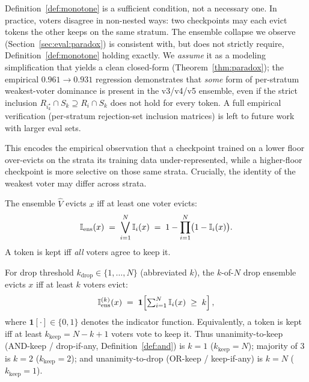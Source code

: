\begin{remark}
Definition~\ref{def:monotone} is a sufficient condition, not a necessary one.
In practice, voters disagree in non-nested ways: two checkpoints may each
evict tokens the other keeps on the same stratum. The ensemble collapse we
observe (Section~\ref{sec:eval:paradox}) is consistent with, but does not
strictly require, Definition~\ref{def:monotone} holding exactly. We
\emph{assume} it as a modeling simplification that yields a clean closed-form
(Theorem~\ref{thm:paradox}); the empirical $0.961\to0.931$ regression
demonstrates that \emph{some} form of per-stratum weakest-voter dominance
is present in the v3/v4/v5 ensemble, even if the strict inclusion
$R_{i^{\star}_k}\cap S_k \supseteq R_i\cap S_k$ does not hold for every
token. A full empirical verification (per-stratum rejection-set inclusion
matrices) is left to future work with larger eval sets.
\end{remark}

This encodes the empirical observation that a checkpoint trained on a lower
floor over-evicts on the strata its training data under-represented, while a
higher-floor checkpoint is more selective on those same strata. Crucially, the
identity of the weakest voter may differ across strata.

\begin{definition}
\label{def:and}
The ensemble $\hat V$ evicts $x$ iff at least one voter evicts:
\[
  \mathbb{I}_{\mathrm{ens}}(x)
  \;=\; \bigvee_{i=1}^{N} \mathbb{I}_i(x)
  \;=\; 1 - \prod_{i=1}^{N}\bigl(1-\mathbb{I}_i(x)\bigr).
\]
A token is kept iff \emph{all} voters agree to keep it.
\end{definition}

\begin{definition}
\label{def:kofn}
For drop threshold $k_{\mathrm{drop}}\in\{1,\dots,N\}$ (abbreviated $k$), the
$k$-of-$N$ drop ensemble evicts $x$ iff at least $k$ voters evict:
\[
  \mathbb{I}_{\mathrm{ens}}^{(k)}(x)
  \;=\; \mathbf{1}\!\left[\textstyle\sum_{i=1}^{N} \mathbb{I}_i(x) \;\ge\; k\right],
\]
where $\mathbf{1}[\cdot]\in\{0,1\}$ denotes the indicator function. Equivalently,
a token is kept iff at least $k_{\mathrm{keep}} = N - k + 1$ voters vote to
keep it. Thus unanimity-to-keep (AND-keep / drop-if-any, Definition~\ref{def:and})
is $k{=}1$ ($k_{\mathrm{keep}}{=}N$); majority of $3$ is $k{=}2$
($k_{\mathrm{keep}}{=}2$); and unanimity-to-drop (OR-keep / keep-if-any) is
$k{=}N$ ($k_{\mathrm{keep}}{=}1$).
\end{definition}

